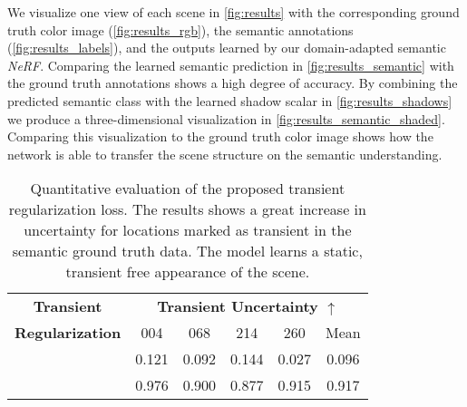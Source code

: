 We visualize one view of each scene in \cref{fig:results} 
with the corresponding ground truth color image (\cref{fig:results_rgb}), the semantic annotations (\cref{fig:results_labels}), and the outputs learned by our domain-adapted semantic \emph{NeRF}.
Comparing the learned semantic prediction in \cref{fig:results_semantic} with the ground truth annotations shows a high degree of accuracy. 
By combining the predicted semantic class with the learned shadow scalar in \cref{fig:results_shadows} we produce a three-dimensional visualization in \cref{fig:results_semantic_shaded}.
Comparing this visualization to the ground truth color image shows how the network is able to transfer  the scene structure on the semantic understanding.
















\begin{table}[t]
	\centering
	\setlength{\tabcolsep}{0.5em} %
	\begin{tabular}{c|cccc|c}
		\toprule
		\textbf{Transient} & \multicolumn{5}{c}{\textbf{Transient Uncertainty $\uparrow$}}\\
		\textbf{Regularization} &004&068&214&260&Mean\\
		\midrule
		
		\crossmark & 0.121 & 0.092 & 0.144 & 0.027 & 0.096\\
		
		\checkmark & 0.976 & 0.900 & 0.877 & 0.915 & 0.917\\
		\bottomrule
	\end{tabular}
	\caption{
		Quantitative evaluation of the proposed transient regularization loss. The results shows a great increase in uncertainty for locations marked as transient in the semantic ground truth data. 
		The model learns a static, transient free appearance of the scene. }
	\label{tbl:semantic_results_car_filtering}
\end{table}




